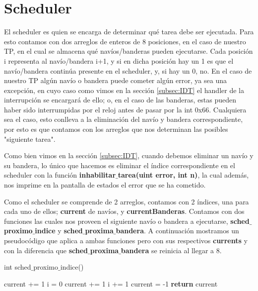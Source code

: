 \section{Scheduler}
\label{subsec:Scheduler}
\par{El scheduler es quien se encarga de determinar qué tarea debe ser ejecutada. Para esto contamos con dos arreglos de enteros de 8 posiciones, en el caso de nuestro TP, en el cual se almacena qué navíos/banderas pueden ejecutarse. Cada posición i representa al navío/bandera i+1, y si en dicha posición hay un 1 es que el navío/bandera continúa presente en el scheduler, y, si hay un 0, no. En el caso de nuestro TP algún navío o bandera puede cometer algún error, ya sea una excepción, en cuyo caso como vimos en la sección \ref{subsec:IDT} el handler de la interrupción se encargará de ello; o, en el caso de las banderas, estas pueden haber sido interrumpidas por el reloj antes de pasar por la int 0x66. Cualquiera sea el caso, esto conlleva a la eliminación del navío y bandera correspondiente, por esto es que contamos con los arreglos que nos determinan las posibles "siguiente tarea".}
\par{
Como bien vimos en la sección \ref{subsec:IDT}, cuando debemos eliminar un navío y su bandera, lo único que hacemos es eliminar el índice correspondiente en el scheduler con la función \textbf{inhabilitar$\_$tarea(uint error, int n)}, la cual además, nos imprime en la pantalla de estados el error que se ha cometido.
}
\par{Como el scheduler se comprende de 2 arreglos, contamos con 2 índices, una para cada uno de ellos; \textbf{current} de navíos, y \textbf{currentBanderas}. Contamos con dos funciones las cuales nos proveen el siguiente navío o bandera a ejecutarse, \textbf{sched$\_$proximo$\_$indice} y \textbf{sched$\_$proxima$\_$bandera}. A continuación mostramos un pseudocódigo que aplica a ambas funciones pero con sus respectivos \textbf{currents} y con la diferencia que \textbf{sched$\_$proxima$\_$bandera} se reinicia al llegar a 8.}

\begin{algorithm}[h!]
\caption{int sched$\_$proximo$\_$indice()}
\begin{algorithmic}
	\State current += 1
	\State i = 0
		\State current += 1
		\State i += 1
	\EndWhile
	\State current = -1
	\EndIf
	\State \textbf{return} current
\end{algorithmic}
\end{algorithm}

